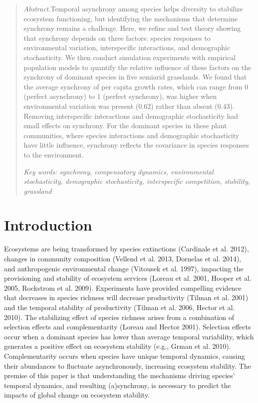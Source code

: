 \documentclass[12pt,]{article}
\begin{document}
\begin{abstract}
\normalsize
\emph{Abstract.}\hspace{1em}Temporal asynchrony among species helps diversity to stabilize ecosystem functioning, but identifying the mechanisms that determine synchrony remains a challenge.
Here, we refine and test theory showing that synchrony depends on three factors: species responses to environmental variation, interspecific interactions, and demographic stochasticity. We then conduct simulation experiments with empirical population models to quantify the relative influence of these factors on the synchrony of dominant species in five semiarid grasslands.
We found that the average synchrony of per capita growth rates, which can range from 0 (perfect asynchrony) to 1 (perfect synchrony), was higher when environmental variation was present (0.62) rather than absent (0.43).
Removing interspecific interactions and demographic stochasticity had small effects on synchrony. 
For the dominant species in these plant communities, where species interactions and demographic stochasticity have little influence, synchrony reflects the covariance in species responses to the environment.

\vspace{1em}

\emph{Key words: synchrony, compensatory dynamics, environmental stochasticity, demographic stochasticity, interspecific competition, stability, grassland}

\end{abstract}

\setlength{\parindent}{5ex}

\section{Introduction}

Ecosystems are being transformed by species extinctions (Cardinale et
al. 2012), changes in community composition (Vellend et al. 2013,
Dornelas et al. 2014), and anthropogenic environmental change (Vitousek
et al. 1997), impacting the provisioning and stability of ecosystem
services (Loreau et al. 2001, Hooper et al. 2005, Rockstrom et al.
2009). Experiments have provided compelling evidence that decreases in
species richness will decrease productivity (Tilman et al. 2001) and the
temporal stability of productivity (Tilman et al. 2006, Hector et al.
2010).
The stabilizing effect of species richness arises from a combination of selection effects and complementarity (Loreau and Hector 2001).
Selection effects occur when a dominant species has lower than average temporal variability, which generates a positive effect on ecosystem stability (e.g., Grman et al. 2010).
Complementarity occurs when species have unique temporal dynamics, causing their abundances to fluctuate asynchronously, increasing ecosystem stability.
The premise of this paper is that understanding the mechanisms driving species' temporal dynamics, and resulting (a)synchrony, is necessary to predict the impacts of global change on ecosystem stability.
\end{document}
